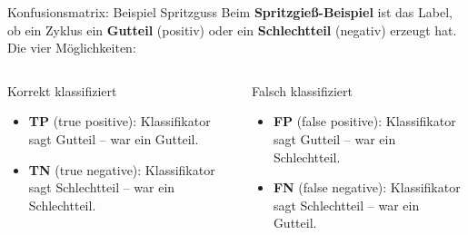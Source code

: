 \begin{frame}{Konfusionsmatrix: Beispiel Spritzguss}
Beim \textbf{Spritzgieß-Beispiel} ist das Label, ob ein Zyklus ein
\textbf{Gutteil} (positiv) oder ein \textbf{Schlechtteil} (negativ)
erzeugt hat. Die vier Möglichkeiten:

\vspace{0.6em}
\begin{columns}[T]
\begin{blockC1}{Korrekt klassifiziert}
\begin{itemize}
  \item \textbf{TP} (true positive): Klassifikator sagt Gutteil -- war ein
        Gutteil.
  \item \textbf{TN} (true negative): Klassifikator sagt Schlechtteil --
        war ein Schlechtteil.
\end{itemize}
\end{blockC1}

\begin{blockC2}{Falsch klassifiziert}
\begin{itemize}
  \item \textbf{FP} (false positive): Klassifikator sagt Gutteil -- war ein
        Schlechtteil.
  \item \textbf{FN} (false negative): Klassifikator sagt Schlechtteil --
        war ein Gutteil.
\end{itemize}
\end{blockC2}
\end{columns}
\end{frame}

